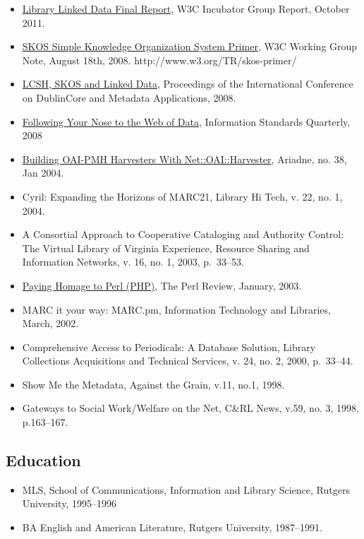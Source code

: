 \begin{itemize}
\item
  \href{http://www.w3.org/2005/Incubator/lld/XGR-lld-20111025/}{Library Linked Data Final Report},
  W3C Incubator Group Report, October 2011.
\item
  \href{http://www.w3.org/TR/skos-primer}{SKOS Simple Knowledge Organization System Primer},
  W3C Working Group Note, August 18th, 2008.
  http://www.w3.org/TR/skos-primer/
\item
  \href{http://dcpapers.dublincore.org/ojs/pubs/article/view/916}{LCSH, SKOS and Linked Data},
  Proceedings of the International Conference on DublinCore and
  Metadata Applications, 2008.
\item
  \href{http://inkdroid.org/journal/2008/01/04/following-your-nose-to-the-web-of-data/}{Following Your Nose to the Web of Data},
  Information Standards Quarterly, 2008
\item
  \href{http://www.ariadne.ac.uk/issue38/summers}{Building OAI-PMH Harvesters With Net::OAI::Harvester},
  Ariadne, no. 38, Jan 2004.
\item
  Cyril: Expanding the Horizons of MARC21, Library Hi Tech, v. 22,
  no. 1, 2004.
\item
  A Consortial Approach to Cooperative Cataloging and Authority
  Control: The Virtual Library of Virginia Experience, Resource
  Sharing and Information Networks, v. 16, no. 1, 2003, p.~33--53.
\item
  \href{http://www.theperlreview.com/articles/php.html}{Paying Homage to Perl (PHP)},
  The Perl Review, January, 2003.
\item
  MARC it your way: MARC.pm, Information Technology and Libraries,
  March, 2002.
\item
  Comprehensive Access to Periodicals: A Database Solution, Library
  Collections Acquisitions and Technical Services, v. 24, no. 2,
  2000, p.~33--44.
\item
  Show Me the Metadata, Against the Grain, v.11, no.1, 1998.
\item
  Gateways to Social Work/Welfare on the Net, C\&RL News, v.59, no.
  3, 1998, p.163--167.
\end{itemize}
\subsection{Education}

\begin{itemize}
\item
  MLS, School of Communications, Information and Library Science,
  Rutgers University, 1995--1996
\item
  BA English and American Literature, Rutgers University, 1987--1991.
\end{itemize}
